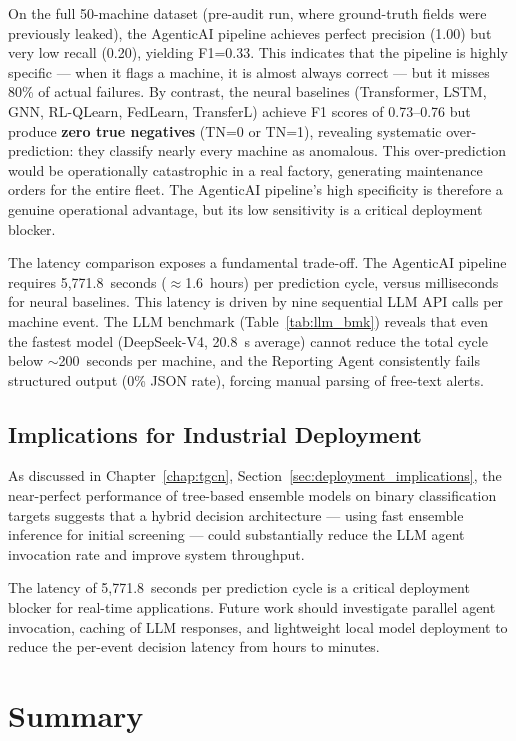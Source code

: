 On the full 50-machine dataset (pre-audit run, where ground-truth fields were previously leaked), the AgenticAI pipeline achieves perfect precision (1.00) but very low recall (0.20), yielding F1=0.33. This indicates that the pipeline is highly specific --- when it flags a machine, it is almost always correct --- but it misses 80\% of actual failures. By contrast, the neural baselines (Transformer, LSTM, GNN, RL-QLearn, FedLearn, TransferL) achieve F1 scores of 0.73--0.76 but produce \textbf{zero true negatives} (TN=0 or TN=1), revealing systematic over-prediction: they classify nearly every machine as anomalous. This over-prediction would be operationally catastrophic in a real factory, generating maintenance orders for the entire fleet. The AgenticAI pipeline's high specificity is therefore a genuine operational advantage, but its low sensitivity is a critical deployment blocker.

The latency comparison exposes a fundamental trade-off. The AgenticAI pipeline requires 5,771.8~seconds ($\approx$1.6~hours) per prediction cycle, versus milliseconds for neural baselines. This latency is driven by nine sequential LLM API calls per machine event. The LLM benchmark (Table~\ref{tab:llm_bmk}) reveals that even the fastest model (DeepSeek-V4, 20.8~s average) cannot reduce the total cycle below $\sim$200~seconds per machine, and the Reporting Agent consistently fails structured output (0\% JSON rate), forcing manual parsing of free-text alerts.

\subsection{Implications for Industrial Deployment}

As discussed in Chapter~\ref{chap:tgcn}, Section~\ref{sec:deployment_implications}, the near-perfect performance of tree-based ensemble models on binary classification targets suggests that a hybrid decision architecture --- using fast ensemble inference for initial screening --- could substantially reduce the LLM agent invocation rate and improve system throughput.

The latency of 5,771.8~seconds per prediction cycle is a critical deployment blocker for real-time applications. Future work should investigate parallel agent invocation, caching of LLM responses, and lightweight local model deployment to reduce the per-event decision latency from hours to minutes.


\section{Summary}

